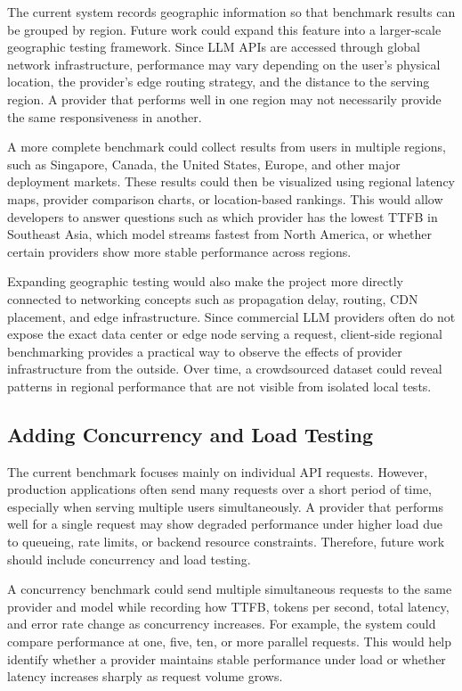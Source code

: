 \documentclass[11pt, a4paper]{article}
\begin{document}
The current system records geographic information so that benchmark results can be grouped by region. Future work could expand this feature into a larger-scale geographic testing framework. Since LLM APIs are accessed through global network infrastructure, performance may vary depending on the user's physical location, the provider's edge routing strategy, and the distance to the serving region. A provider that performs well in one region may not necessarily provide the same responsiveness in another.

A more complete benchmark could collect results from users in multiple regions, such as Singapore, Canada, the United States, Europe, and other major deployment markets. These results could then be visualized using regional latency maps, provider comparison charts, or location-based rankings. This would allow developers to answer questions such as which provider has the lowest TTFB in Southeast Asia, which model streams fastest from North America, or whether certain providers show more stable performance across regions.

Expanding geographic testing would also make the project more directly connected to networking concepts such as propagation delay, routing, CDN placement, and edge infrastructure. Since commercial LLM providers often do not expose the exact data center or edge node serving a request, client-side regional benchmarking provides a practical way to observe the effects of provider infrastructure from the outside. Over time, a crowdsourced dataset could reveal patterns in regional performance that are not visible from isolated local tests.

\subsection{Adding Concurrency and Load Testing}

The current benchmark focuses mainly on individual API requests. However, production applications often send many requests over a short period of time, especially when serving multiple users simultaneously. A provider that performs well for a single request may show degraded performance under higher load due to queueing, rate limits, or backend resource constraints. Therefore, future work should include concurrency and load testing.

A concurrency benchmark could send multiple simultaneous requests to the same provider and model while recording how TTFB, tokens per second, total latency, and error rate change as concurrency increases. For example, the system could compare performance at one, five, ten, or more parallel requests. This would help identify whether a provider maintains stable performance under load or whether latency increases sharply as request volume grows.
\end{document}
